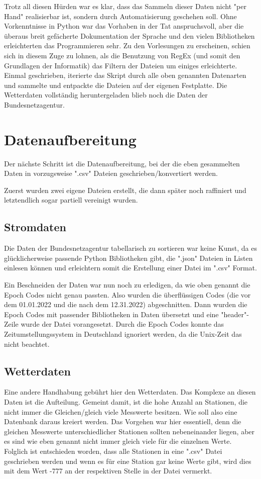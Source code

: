 \documentclass[letterpaper]{article} %
\begin{document}
        Trotz all diesen Hürden war es klar, dass das Sammeln dieser Daten nicht "per Hand" realisierbar ist, sondern durch Automatisierung geschehen soll. Ohne Vorkenntnisse in Python war das Vorhaben in der Tat anspruchsvoll, aber die überaus breit gefächerte Dokumentation der Sprache und den vielen Bibliotheken erleichterten das Programmieren sehr.
        Zu den Vorlesungen zu erscheinen, schien sich in diesem Zuge zu lohnen, als die Benutzung von RegEx (und somit den Grundlagen der Informatik) das Filtern der Dateien um einiges erleichterte. Einmal geschrieben, iterierte das Skript durch alle oben genannten Datenarten und sammelte und entpackte die Dateien auf der eigenen Festplatte. 
        Die Wetterdaten vollständig heruntergeladen blieb noch die Daten der Bundesnetzagentur.



\section*{Datenaufbereitung}
    Der nächste Schritt ist die Datenaufbereitung, bei der die eben gesammelten Daten in vorzugsweise ".csv" Dateien geschrieben/konvertiert werden.

    Zuerst wurden zwei eigene Dateien erstellt, die dann später noch raffiniert und letztendlich sogar partiell vereinigt wurden.

    \subsection*{Stromdaten}
        Die Daten der Bundesnetzagentur tabellarisch zu sortieren war keine Kunst, da es glücklicherweise passende Python Bibliotheken gibt, die ".json" Dateien in Listen einlesen können und erleichtern somit die Erstellung einer Datei im ".csv" Format.
        
        Ein Beschneiden der Daten war nun noch zu erledigen, da wie oben genannt die Epoch Codes nicht genau passten. Also wurden die überflüssigen Codes (die vor dem 01.01.2022 und die nach dem 12.31.2022) abgeschnitten. Dann wurden die Epoch Codes mit passender Bibliotheken in Daten übersetzt und eine "header"-Zeile wurde der Datei vorangesetzt. Durch die Epoch Codes konnte das Zeitumstellungssystem in Deutschland ignoriert werden, da die Unix-Zeit das nicht beachtet.
    \subsection*{Wetterdaten}
        Eine andere Handhabung gebührt hier den Wetterdaten. Das Komplexe an diesen Daten ist die Aufteilung. Gemeint damit, ist die hohe Anzahl an Stationen, die nicht immer die Gleichen/gleich viele Messwerte besitzen. Wie soll also eine Datenbank daraus kreiert werden. Das Vorgehen war hier essentiell, denn die gleichen Messwerte unterschiedlicher Stationen sollten nebeneinander liegen, aber es sind wie eben genannt nicht immer gleich viele für die einzelnen Werte.
        Folglich ist entschieden worden, dass alle Stationen in eine ".csv" Datei geschrieben werden und wenn es für eine Station gar keine Werte gibt, wird dies mit dem Wert -777 an der respektiven Stelle in der Datei vermerkt.
\end{document}
